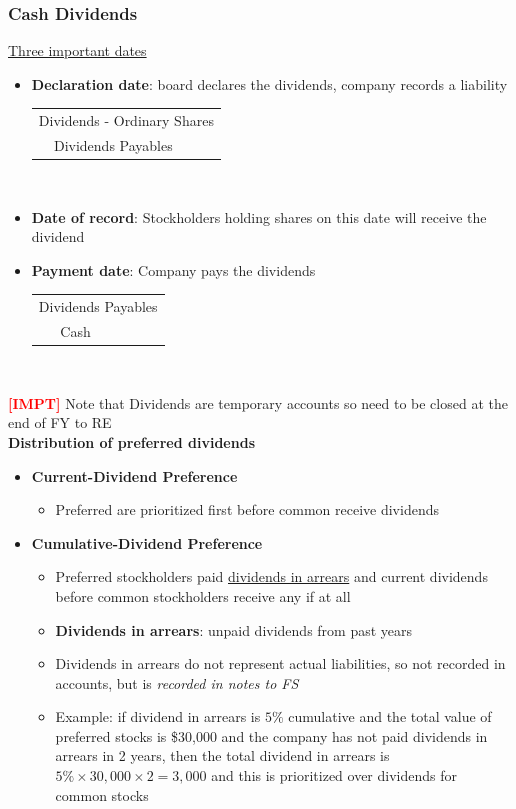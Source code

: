 \documentclass{article}
\newcommand{\impt}[0]{\textcolor{red}{\textbf{[IMPT] }}}
\begin{document}
\begin{multicols}{2}
\subsubsection{Cash Dividends}
\underline{Three important dates}
\begin{itemize}
	\item \textbf{Declaration date}: board declares the dividends, company records a liability\vspace{0.5em}\\
	\begin{tabular}{llll}
		\multicolumn{4}{l}{Dividends - Ordinary Shares}\\
		& Dividends Payables & &
	\end{tabular}\vspace{0.5em}\\
\item \textbf{Date of record}: Stockholders holding shares on this date will receive the dividend
\item \textbf{Payment date}: Company pays the dividends\vspace{0.5em}\\
\begin{tabular}{llll}
	\multicolumn{4}{l}{Dividends Payables}\\
	& Cash & &
\end{tabular}\vspace{0.5em}\\
\end{itemize}
\impt Note that Dividends are temporary accounts so need to be closed at the end of FY to RE\vspace{0.5em}\\
\textbf{Distribution of preferred dividends}
\begin{itemize}
	\item \textbf{Current-Dividend Preference}
	\begin{itemize}
		\item Preferred are prioritized first before common receive dividends
	\end{itemize}
    \item \textbf{Cumulative-Dividend Preference}
    \begin{itemize}
    	\item Preferred stockholders paid \underline{dividends in arrears} and current dividends before common stockholders receive any if at all
    	\item \textbf{Dividends in arrears}: unpaid dividends from past years
    	\item Dividends in arrears do not represent actual liabilities, so not recorded in accounts, but is \textit{recorded in notes to FS}
    	\item Example: if dividend in arrears is $5\%$ cumulative and the total value of preferred stocks is \$30,000 and the company has not paid dividends in arrears in 2 years, then the total dividend in arrears is $5\%\times30,000\times2=3,000$ and this is prioritized over dividends for common stocks
    \end{itemize}
\end{itemize}


\end{multicols}
\end{document}
